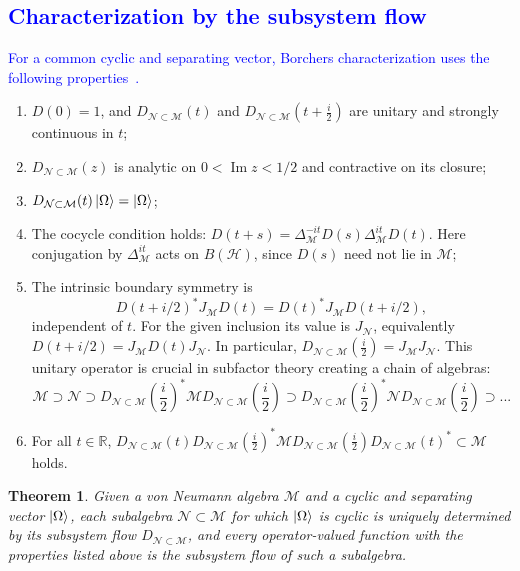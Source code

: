 \documentclass[a4paper,11pt]{article}
\newtheorem{theorem}{Theorem}
\theoremstyle{definition}
\newcommand{\mN}{\mathcal{N}}
\newcommand{\mH}{\mathcal{H}}
\newcommand{\mM}{\mathcal{M}}
\newcommand{\NL}[1]{\textcolor{blue}{#1}}
\begin{document}
\subsection{\NL{Characterization by the subsystem flow}}
\label{app:characteristic-function}

\NL{For a common cyclic and separating vector, Borchers\textquotesingle{} characterization uses the following properties~\cite{revolutionizing}.}

\begin{enumerate}
    \item $D(0)=1$, and $D_{\mN\subset\mM}(t)$ and $D_{\mN\subset\mM}(t +\frac{i}{2})$ are unitary and strongly continuous in $t$;
    \item $D_{\mN\subset\mM}(z)$ is analytic on $0<\operatorname{Im}z<1/2$ and contractive on its closure;
    \item $D_{\mN\subset\mM}(t)\ket{\Omega} = \ket{\Omega}$;
    \item The cocycle condition holds: $D(t+s)=\Delta_{\mM}^{-it}D(s)\Delta_{\mM}^{it}D(t)$. Here conjugation by $\Delta_{\mM}^{it}$ acts on $B(\mH)$, since $D(s)$ need not lie in $\mM$;
    \item The intrinsic boundary symmetry is
    \[
     D(t+i/2)^*J_{\mM} D(t)=D(t)^*J_{\mM} D(t+i/2),
    \]
    independent of $t$. For the given inclusion its value is $J_{\mN}$, equivalently
    $D(t+i/2)=J_{\mM} D(t)J_{\mN}$. In particular, $D_{\mN\subset\mM}(\frac{i}{2}) = J_{\mM}J_{\mN}$. This unitary operator is crucial in subfactor theory creating a chain of algebras:
    \begin{equation}
        \mM\supset\mN\supset D_{\mN\subset\mM}(\frac{i}{2})^*\mM D_{\mN\subset\mM}(\frac{i}{2})\supset D_{\mN\subset\mM}(\frac{i}{2})^*\mN D_{\mN\subset\mM}(\frac{i}{2})\supset...
    \end{equation}
    \item For all $t\in\mathbb{R}$, $D_{\mN\subset\mM}(t)D_{\mN\subset\mM}(\frac{i}{2})^*\mM D_{\mN\subset\mM}(\frac{i}{2})D_{\mN\subset\mM}(t)^*\subset\mM$ holds.
\end{enumerate}

\begin{theorem}
    Given a von Neumann algebra $\mM$ and a cyclic and separating vector $\ket{\Omega}$, each subalgebra $\mN\subset\mM$ for which $\ket{\Omega}$ is cyclic is uniquely determined by its subsystem flow $D_{\mN\subset\mM}$, and every operator-valued function with the properties listed above is the subsystem flow of such a subalgebra.
\end{theorem}
\end{document}
